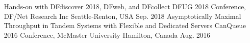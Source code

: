 
\begin{cventries}

\cventry
{Hands-on with DFdiscover 2018, DFweb, and DFcollect} %
{DFUG 2018 Conference, DF/Net Research Inc} %
{Seattle-Renton, USA} %
{Sep. 2018} %
{}
\cventry
{Asymptotically Maximal Throughput in Tandem Systems with Flexible and Dedicated Servers} %
{CanQueue 2016 Conference, McMaster University} %
{Hamilton, Canada} %
{Aug. 2016} %
{}
\end{cventries}
\vspace{-1em}